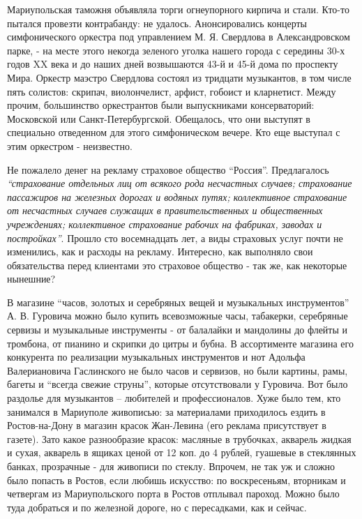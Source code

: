 Мариупольская таможня объявляла торги огнеупорного кирпича и стали. Кто-то
пытался провезти контрабанду: не удалось. Анонсировались концерты
симфонического оркестра под управлением М. Я. Свердлова в Александровском парке,
- на месте этого некогда зеленого уголка нашего города с середины 30-х годов XX
века и до наших дней возвышаются 43-й и 45-й дома по проспекту Мира. Оркестр
маэстро Свердлова состоял из тридцати музыкантов, в том числе пять солистов:
скрипач, виолончелист, арфист, гобоист и кларнетист. Между прочим, большинство
оркестрантов были выпускниками консерваторий: Московской или
Санкт-Петербургской. Обещалось, что они выступят в специально отведенном для
этого симфоническом вечере. Кто еще выступал с этим оркестром - неизвестно.

Не пожалело денег на рекламу страховое общество \enquote{Россия}. Предлагалось
\emph{\enquote{страхование отдельных лиц от всякого рода несчастных случаев; страхование
пассажиров на железных дорогах и водяных путях; коллективное страхование от
несчастных случаев служащих в правительственных и общественных учреждениях;
коллективное страхование рабочих на фабриках, заводах и постройках}}. Прошло сто
восемнадцать лет, а виды страховых услуг почти не изменились, как и расходы на
рекламу. Интересно, как выполняло свои обязательства перед клиентами это
страховое общество - так же, как некоторые нынешние?


В магазине \enquote{часов, золотых и серебряных вещей и музыкальных инструментов} А. В.
Гуровича можно было купить всевозможные часы, табакерки, серебряные сервизы и
музыкальные инструменты - от балалайки и мандолины до флейты и тромбона, от
пианино и скрипки до цитры и бубна. В ассортименте магазина его конкурента по
реализации музыкальных инструментов и нот Адольфа Валериановича Гаслинского не
было часов и сервизов, но были картины, рамы, багеты и \enquote{всегда свежие струны},
которые отсутствовали у Гуровича. Вот было раздолье для музыкантов – любителей
и профессионалов. Хуже было тем, кто занимался в Мариуполе живописью: за
материалами приходилось ездить в Ростов-на-Дону в магазин красок Жан-Левина
(его реклама присутствует в газете). Зато какое разнообразие красок: масляные в
трубочках, акварель жидкая и сухая, акварель в ящиках ценой от 12 коп. до 4
рублей, гуашевые в стеклянных банках, прозрачные - для живописи по стеклу.
Впрочем, не так уж и сложно было попасть в Ростов, если любишь искусство: по
воскресеньям, вторникам и четвергам из Мариупольского порта в Ростов отплывал
пароход. Можно было туда добраться и по железной дороге, но с пересадками, как
и сейчас.


